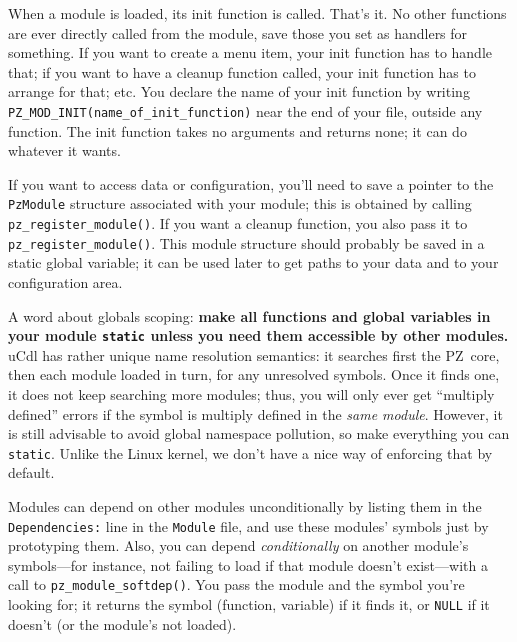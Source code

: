 \documentclass[12pt,letterpaper]{report}
\def\pz{{\footnotesize PZ}}
\let\ttt\tt
\def\tt{\def\_{{\ttt\char`\_}}\ttt}
\begin{document}
When a module is loaded, its init function is called. That's it. No other functions are ever
directly called from the module, save those you set as handlers for something. If you want
to create a menu item, your init function has to handle that; if you want to have a cleanup
function called, your init function has to arrange for that; etc. You declare the name of
your init function by writing \verb|PZ_MOD_INIT(name_of_init_function)| near the end of your
file, outside any function. The init function takes no arguments and returns none; it can do
whatever it wants.

If you want to access data or configuration, you'll need to save a pointer to the \verb|PzModule|
structure associated with your module; this is obtained by calling \verb|pz_register_module()|.
If you want a cleanup function, you also pass it to \verb|pz_register_module()|. This module
structure should probably be saved in a static global variable; it can be used later to get
paths to your data and to your configuration area.

A word about globals scoping: {\bf make all functions and global variables in your module
\verb|static| unless you need them accessible by other modules.}
uCdl has rather unique name resolution semantics: it searches first the \pz\ core, then each
module loaded in turn, for any unresolved symbols. Once it finds one, it does not keep searching
more modules; thus, you will only ever get ``multiply defined'' errors if the symbol is multiply
defined in the {\it same module}. However, it is still advisable to avoid global namespace pollution,
so make everything you can \verb|static|. Unlike the Linux kernel, we don't have a nice
way of enforcing that by default.

Modules can depend on other modules unconditionally by listing them in the {\tt Dependencies:} line
in the \verb|Module| file, and use these modules' symbols just by prototyping them. Also, you
can depend {\it conditionally} on another module's symbols---for instance, not failing to load if that
module doesn't exist---with a call to \verb|pz_module_softdep()|. You pass the module and the symbol
you're looking for; it returns the symbol (function, variable) if it finds it, or \verb|NULL| if
it doesn't (or the module's not loaded).
\end{document}
